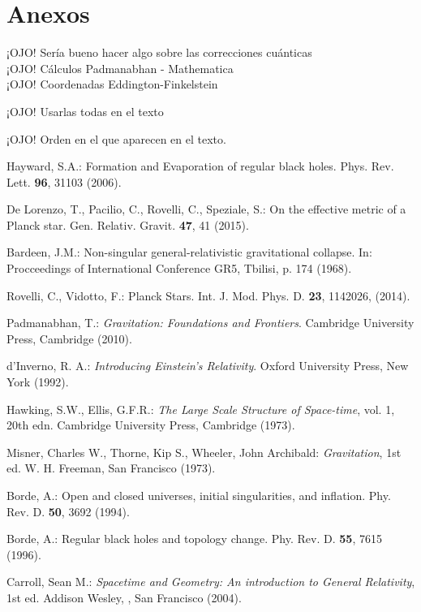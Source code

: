 \documentclass[prb,aps,preprintnumbers,amsmath,amssymb]{article}
\numberwithin{equation}{section}
\begin{document}
\section{Anexos}

¡OJO! Sería bueno hacer algo sobre las correcciones cuánticas\\

¡OJO! Cálculos Padmanabhan - Mathematica\\

¡OJO! Coordenadas Eddington-Finkelstein\\


\begin{thebibliography}{10}

 ¡OJO! Usarlas todas en el texto

 ¡OJO! Orden en el que aparecen en el texto.

 Hayward, S.A.: Formation and Evaporation of regular black holes. Phys. Rev. Lett. \textbf{96}, 31103 (2006).

 De Lorenzo, T., Pacilio, C., Rovelli, C., Speziale, S.: On the effective metric of a Planck star. Gen. Relativ. Gravit. \textbf{47}, 41 (2015).

 Bardeen, J.M.: Non-singular general-relativistic gravitational collapse. In: Procceedings of International Conference GR5, Tbilisi, p. 174 (1968).

 Rovelli, C., Vidotto, F.: Planck Stars. Int. J. Mod. Phys. D. \textbf{23}, 1142026, (2014).


 Padmanabhan, T.: \textit{Gravitation: Foundations and Frontiers}. Cambridge University Press, Cambridge (2010).

 d'Inverno, R. A.: \textit{Introducing Einstein's Relativity}. Oxford University Press, New York (1992).

 Hawking, S.W., Ellis, G.F.R.: \textit{The Large Scale Structure of Space-time}, vol. 1, 20th edn. Cambridge University Press, Cambridge (1973).

 Misner, Charles W., Thorne, Kip S., Wheeler, John Archibald: \textit{Gravitation}, 1st ed. W. H. Freeman, San Francisco (1973).

 Borde, A.: Open and closed universes, initial singularities, and inflation. Phy. Rev. D. \textbf{50}, 3692 (1994).

 Borde, A.: Regular black holes and topology change. Phy. Rev. D. \textbf{55}, 7615 (1996).

 Carroll, Sean M.: \textit{Spacetime and Geometry: An introduction to General Relativity}, 1st ed. Addison Wesley, , San Francisco (2004). 

\end{thebibliography}
\end{document}
